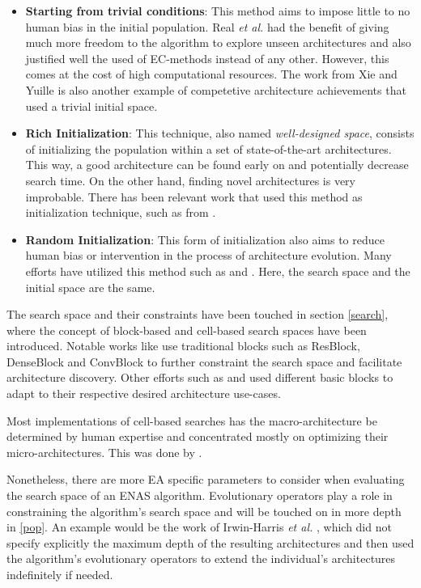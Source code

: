 \documentclass[10pt,        %
               a4paper,     %
               journal,     %
               ]{IEEEtran}
\begin{document}
\begin{itemize}
    \item \textbf{Starting from trivial conditions}: This method aims to impose little to no human bias in the initial
     population. Real \textit{et al.} \cite{pmlr-v70-real17a} had the benefit of giving much more freedom to the algorithm
     to explore unseen architectures and also justified well the used of EC-methods instead of any other.
     However, this comes at the cost of high computational resources. The work from Xie and Yuille \cite{xie2017genetic} is
     also another example of competetive architecture achievements that used a trivial initial space.

    \item \textbf{Rich Initialization}: This technique, also named \textit{well-designed space}, consists of initializing
    the population within a set of state-of-the-art architectures. This way, a good architecture can be found early on
    and potentially decrease search time. On the other hand, finding novel architectures is very improbable. There has been
    relevant work that used this method as initialization technique, such as from \cite{fujino2017deep}.

    \item \textbf{Random Initialization}: This form of initialization also aims to reduce human bias or intervention in
     the process of architecture evolution. Many efforts have utilized this method such as \cite{sun2019evolving} and
     \cite{sun2019completely}. Here, the search space and the initial space are the same.
\end{itemize}

The search space and their constraints have been touched in section \ref{search}, where the concept of block-based and cell-based
search spaces have been introduced. Notable works like \cite{sun2019completely} use traditional blocks such as ResBlock, DenseBlock
and ConvBlock to further constraint the search space and facilitate architecture discovery. Other efforts such as
\cite{chen2019auto} and \cite{song2020efficient} used different basic blocks to adapt to their respective desired architecture
use-cases.

Most implementations of cell-based searches has the macro-architecture be determined by human expertise and concentrated mostly
on optimizing their micro-architectures. This was done by \cite{real2019regularized}.

Nonetheless, there are more EA specific
parameters to consider when evaluating the search space of an ENAS algorithm. Evolutionary operators play a role in
constraining the algorithm's search space and will be touched on in more depth in \ref{pop}. An example would be the
work of Irwin-Harris \textit{et al.} \cite{irwin2019graph}, which did not specify explicitly the maximum depth of the
resulting architectures and then used the algorithm's evolutionary operators to extend the individual's architectures
indefinitely if needed.
\end{document}

